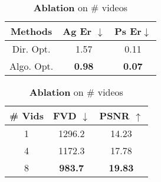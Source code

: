\begin{table}[!htb]
    \begin{minipage}{.5\linewidth}
          \centering
        \caption{\textbf{Ablation} Opt. vs. Algo.}
        \label{tab:runtime}
        \vspace{-0.15in}
        \footnotesize
        \begin{tabular}{c|cc}
\hline
Methods       & Ag Er $\downarrow$          & Ps Er$\downarrow$                   \\ \hline
Dir. Opt.        & 1.57          & 0.11           \\
\cellcolor{blue!15} Algo. Opt. & \cellcolor{blue!15}\textbf{0.98} & \cellcolor{blue!15}\bf 0.07 \\ \hline
\end{tabular}
\label{tab:dir_vs_algo.}
    \end{minipage}%
    \begin{minipage}{.5\linewidth}
 \caption{\textbf{Ablation} on \# videos}
 \label{tab:user}
      \vspace{-0.15in}
      \footnotesize
      \centering
\begin{tabular}{c|cc}
\hline
\# Vids & FVD $\downarrow$ & PSNR $\uparrow$ \\ \hline
1    & 1296.2            &  14.23     \\
4  & 1172.3             & 17.78   \\ \hline

\cellcolor{blue!15}  8   & \cellcolor{blue!15}\bf 983.7 & \cellcolor{blue!15}\bf{19.83}                \\ \hline
\end{tabular}
\label{tab:num_vids}
    \end{minipage}
    \vspace{-0.15in}
\end{table}